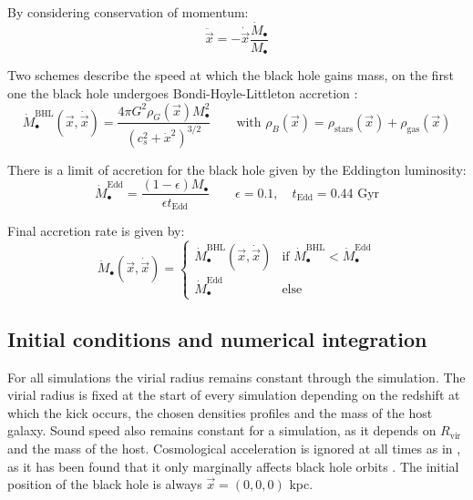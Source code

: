 			By considering conservation of momentum:
			\begin{equation}
				\ddot{\vec{x}} = - \dot{\vec{x}}\dfrac{\dot{M}_\bullet}{M_\bullet}
			\end{equation}
			
			Two schemes describe the speed at which the black hole gains mass, on the first one the black hole undergoes Bondi-Hoyle-Littleton accretion \cite{tanaka2009assembly, choksi2017recoiling}:
			\begin{equation}
				\dot{M}_\bullet^\text{BHL}(\vec{x}, \dot{\vec{x}}) = \dfrac{4\pi G^2 \rho_G(\vec{x})M^2_\bullet}{\left(c_s^2 + \dot{x}^2\right)^{3/2}} \qquad \text{with } \rho_B(\vec{x}) = \rho_\text{stars}(\vec{x}) + \rho_\text{gas}(\vec{x})
			\end{equation}
			
			There is a limit of accretion for the black hole given by the Eddington luminosity:
			\begin{equation}
				\dot{M}_\bullet^\text{Edd} = \dfrac{(1 - \epsilon)M_\bullet}{\epsilon t_\text{Edd}} \qquad \epsilon = 0.1, \quad t_\text{Edd} = 0.44 \text{ Gyr}
			\end{equation}
			
			Final accretion rate is given by:
			\begin{equation}
				\dot{M}_\bullet(\vec{x}, \dot{\vec{x}}) = \left\{
				\begin{array}{lc}
				\dot{M}_\bullet^\text{BHL}(\vec{x}, \dot{\vec{x}}) & \text{if $\dot{M}_\bullet^\text{BHL} < \dot{M}_\bullet^\text{Edd}$} \\
				\dot{M}_\bullet^\text{Edd} & \text{else}
				\end{array}
				\right.
			\end{equation}
	
	\subsection{Initial conditions and numerical integration}
		For all simulations the virial radius remains constant through the simulation. The virial radius is fixed at the start of every simulation depending on the redshift at which the kick occurs, the chosen densities profiles and the mass of the host galaxy. Sound speed also remains constant for a simulation, as it depends on $R_\text{vir}$ and the mass of the host. Cosmological acceleration is ignored at all times as in \citeauthor{tanaka2009assembly}, as it has been found that it only marginally affects black hole orbits \cite{choksi2017recoiling}. The initial position of the black hole is always $\vec{x} = (0, 0, 0)$ kpc.
		
